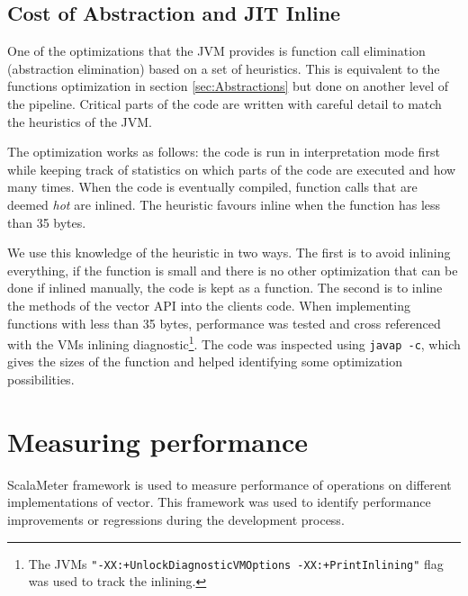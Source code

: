 \subsection{Cost of Abstraction and JIT Inline}
One of the optimizations that the JVM provides is function call elimination (abstraction elimination) based on a set of heuristics. This is equivalent to the functions optimization in section \ref{sec:Abstractions} but done on another level of the pipeline. Critical parts of the code are written with careful detail to match the heuristics of the JVM. 

The optimization works as follows: the code is run in interpretation mode first while keeping track of statistics on which parts of the code are executed and how many times. When the code is eventually compiled, function calls that are deemed \emph{hot} are inlined. The heuristic favours inline when the function has less than 35 bytes. 

We use this knowledge of the heuristic in two ways. The first is to avoid inlining everything, if the function is small and there is no other optimization that can be done if inlined manually, the code is kept as a function. The second is to inline the methods of the vector API into the clients code. When implementing functions with less than 35 bytes, performance was tested and cross referenced with the VMs inlining diagnostic\footnote{The JVMs \texttt{"-XX:+UnlockDiagnosticVMOptions -XX:+PrintInlining"} flag was used to track the inlining.}. The code was inspected using \texttt{javap -c}, which gives the sizes of the function and helped identifying some optimization possibilities.

\clearpage
\section{Measuring performance}
\label{Measuringperformance}
ScalaMeter framework\cite{scalameter} is used to measure performance of operations on different implementations of vector. This framework was used to identify performance improvements or regressions during the development process. 

